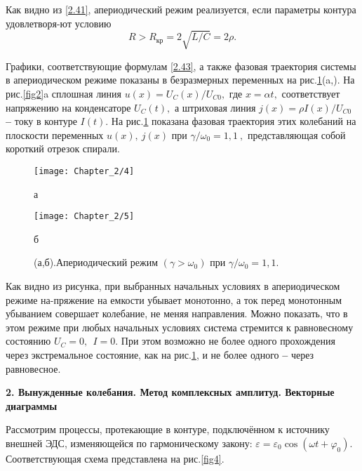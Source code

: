 Как видно из \eqref{2.41}, апериодический режим реализуется, если параметры контура удовлетворя-ют условию
\begin{equation}\label{2.44}
R>R_{\text{кр}}=2\sqrt{L/C}=2\rho.
\end{equation}

Графики, соответствующие формулам \eqref{2.43}, а также фазовая траектория системы в аперио\-дическом режиме показаны в безразмерных переменных на рис.\ref{fig3}(a,). На рис.\ref{fig2}a сплошная линия $u(x)=U_C(x)/U_{C0},$ где $x=\alpha t,$ соответствует напряжению на конденсаторе $U_C(t),$ а штриховая линия $j(x)=\rho I(x)/U_{C0}$ \textbf{--} току в контуре $I(t).$ На рис.\ref{fig3}  показана фазовая тра\-ектория этих колебаний на плоскости переменных $u(x),~j(x)$   при $\gamma/\omega_0=1,1~,$ представляющая собой короткий отрезок спирали.

\begin{figure}[h]
	\begin{minipage}[h]{0.49\linewidth}
		\centering
		\texttt{[image: Chapter\_2/4]}
		\caption{а}
	\end{minipage}
	\hfill
	\begin{minipage}[h]{0.49\linewidth}
		\centering
		\texttt{[image: Chapter\_2/5]}
		\caption{б}
	\end{minipage}
	\caption{(а,б).Апериодический режим $(\gamma>\omega_0)$ при $\gamma/\omega_0=1,1$.}
	\label{fig3}
\end{figure}

Как видно из рисунка, при выбранных начальных условиях в апериодическом режиме на-пряжение на емкости убывает монотонно, а ток перед монотонным убыванием совершает коле\-бание, не меняя направления. Можно показать, что в этом режиме при любых начальных усло\-виях система стремится к равновесному состоянию $U_C=0,~~I=0.$ При этом возможно не более одного прохождения через экстремальное  состояние, как на рис.\ref{fig3}, и не более одного \textbf{--} через равновесное.

\begin{center}
	\textbf{2. Вынужденные колебания. Метод комплексных амплитуд. Векторные диаграммы}
\end{center}

Рассмотрим процессы, протекающие в контуре, подключённом к источнику внешней ЭДС, изменяющейся по гармоническому закону:  $\varepsilon=\varepsilon_0\cos(\omega t+\varphi_0).$ Соответствующая схема пред\-ставлена на рис.\ref{fig4}.

